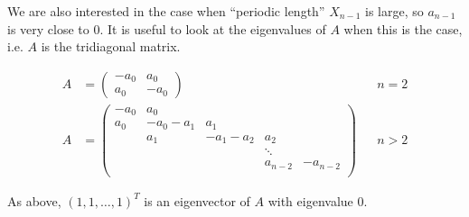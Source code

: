 \documentclass[12pt]{article}
\begin{document}
We are also interested in the case when ``periodic length'' $X_{n-1}$ is large, so $a_{n-1}$ is very close to 0. It is useful to look at the eigenvalues of $A$ when this is the case, i.e. $A$ is the tridiagonal matrix. 

\begin{align}\label{Atridiag}
A &= \begin{pmatrix}
-a_0 & a_0 \\
a_0 & -a_0 
\end{pmatrix} && n = 2 \\
A &= \begin{pmatrix}
- a_0 & a_0 & & &  \\
a_0 & -a_0 - a_1 &  a_1 \\
& a_1 & -a_1 - a_2 &  a_2 \\
& & & \ddots \\
& & & a_{n-2} & -a_{n-2} \\
\end{pmatrix} && n > 2 \nonumber
\end{align}

As above, $(1, 1, \dots, 1)^T$ is an eigenvector of $A$ with eigenvalue 0.
\end{document}
